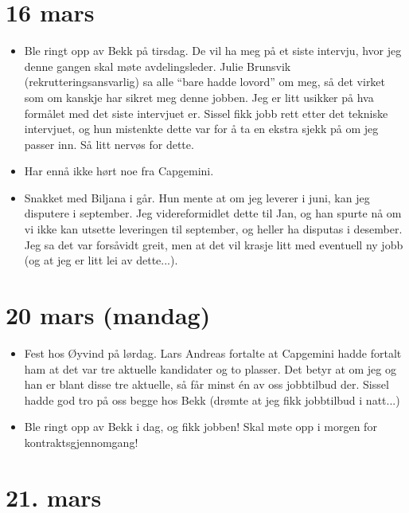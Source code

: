 \documentclass[11pt, norsk]{article}
\begin{document}

\section{16 mars} %
\label{sec:16_mars}

\begin{itemize}
  \item Ble ringt opp av Bekk på tirsdag. De vil ha meg på et siste intervju, hvor jeg denne gangen skal møte avdelingsleder. Julie Brunsvik (rekrutteringsansvarlig) sa alle ``bare hadde lovord'' om meg, så det virket som om kanskje har sikret meg denne jobben. Jeg er litt usikker på hva formålet med det siste intervjuet er. Sissel fikk jobb rett etter det tekniske intervjuet, og hun mistenkte dette var for å ta en ekstra sjekk på om jeg passer inn. Så litt nervøs for dette.
  \item Har ennå ikke hørt noe fra Capgemini.
  \item Snakket med Biljana i går. Hun mente at om jeg leverer i juni, kan jeg disputere i september. Jeg videreformidlet dette til Jan, og han spurte nå om vi ikke kan utsette leveringen til september, og heller ha disputas i desember. Jeg sa det var forsåvidt greit, men at det vil krasje litt med eventuell ny jobb (og at jeg er litt lei av dette...).
\end{itemize}


\section{20 mars (mandag)} %
\label{sec:20_mars}

\begin{itemize}
  \item Fest hos Øyvind på lørdag. Lars Andreas fortalte at Capgemini hadde fortalt ham at det var tre aktuelle kandidater og to plasser. Det betyr at om jeg og han er blant disse tre aktuelle, så får minst én av oss jobbtilbud der. Sissel hadde god tro på oss begge hos Bekk (drømte at jeg fikk jobbtilbud i natt...)
  \item Ble ringt opp av Bekk i dag, og fikk jobben! Skal møte opp i morgen for kontraktsgjennomgang! 
\end{itemize}

\section{21. mars} %
\label{sec:21_mars}
\end{document}
